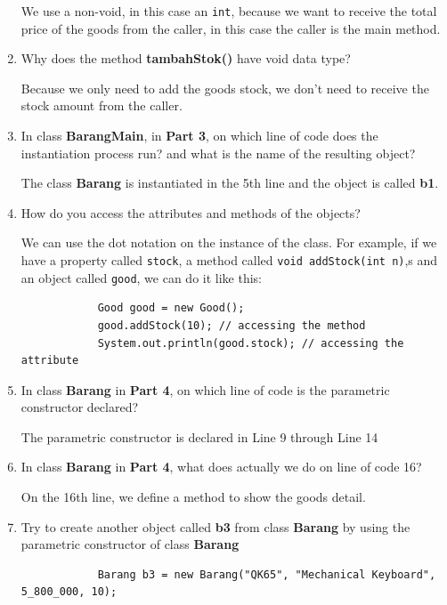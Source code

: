 \documentclass[12pt,titlepage]{article}
\begin{document}
\begin{enumerate}
{        We use a non-void, in this case an \texttt{int},
        because we want to receive the total price of the goods from the caller, in this case the caller is the main method.
    }
    \item {
        Why does the method \textbf{tambahStok()} have void data type?

        Because we only need to add the goods stock, we don't need to receive the stock amount from the caller.
    }
    \item {
        In class \textbf{BarangMain}, in \textbf{Part 3}, on which line of code does the instantiation process run? and what is the name of the resulting object?

        The class \textbf{Barang} is instantiated in the 5th line and the object is called \textbf{b1}.
    }
    \newpage
    \item {
        How do you access the attributes and methods of the objects?

        We can use the dot notation on the instance of the class.
        For example, if we have a property called \texttt{stock}, a method called \texttt{void addStock(int n)},s and an object called \texttt{good},
        we can do it like this:

        \begin{verbatim}
            Good good = new Good();
            good.addStock(10); // accessing the method
            System.out.println(good.stock); // accessing the attribute
        \end{verbatim}
    }
    \item {
        In class \textbf{Barang} in \textbf{Part 4}, on which line of code is the parametric constructor declared?

        The parametric constructor is declared in Line 9 through Line 14
    }
    \item {
        In class \textbf{Barang} in \textbf{Part 4}, what does actually we do on line of code 16?

        On the 16th line, we define a method to show the goods detail.
    }
    \item {
        Try to create another object called \textbf{b3} from class \textbf{Barang} by using the parametric constructor of class \textbf{Barang}

        \begin{verbatim}
            Barang b3 = new Barang("QK65", "Mechanical Keyboard", 5_800_000, 10);
        \end{verbatim}
    }
\end{enumerate}
\end{document}
